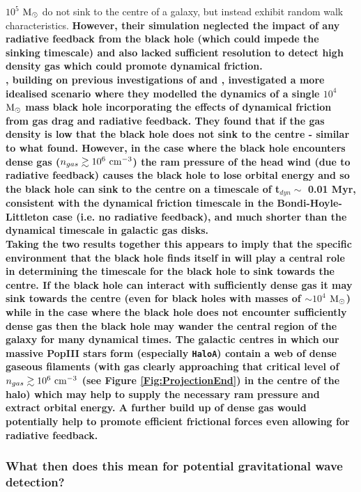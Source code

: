 \documentclass[twocolumn,iop,revtex4]{openjournal}
\newcommand{\msolar} {$\rm{M_{\odot}}~$}
\newcommand{\msolarc} {$\rm{M_{\odot}}$}
\newcommand{\hac} {\texttt{HaloA}}
\begin{document}
$10^5$ \msolar do not sink to the centre of a galaxy, but instead exhibit random walk characteristics.
\textbf{However, their simulation neglected the impact of any radiative feedback from the black hole 
(which could impede the sinking timescale) and
also lacked sufficient resolution to detect high density gas which could promote dynamical friction. \\
\indent \cite{Toyouchi_2020}, building on previous investigations of \cite{Park_2017} and \cite{Park_2019},
investigated a more idealised scenario where they modelled the
dynamics of a single $10^4$ \msolar mass black hole incorporating the effects of dynamical friction from gas drag
and radiative feedback. They found that if the gas density is low that the black hole
does not sink to the centre - similar to what \cite{Pfister_2019} found. However, in the case where
the black hole encounters dense gas ($n_{gas} \gtrsim 10^6 \ \rm{cm}^{-3}$) the ram pressure of
the head wind (due to radiative feedback)
causes the black hole to lose orbital energy and so the black hole can sink to the centre on a
timescale of t$_{dyn} \sim$ 0.01 Myr, consistent with the dynamical friction timescale
in the Bondi-Hoyle-Littleton case (i.e. no radiative feedback),
and much shorter than the dynamical timescale in galactic gas disks.\\
\indent Taking the two results together this
appears to imply that the specific environment that the black hole finds
itself in will play a central role in determining the timescale for the black hole
to sink towards the centre. If the black hole can interact with sufficiently dense gas it may
sink towards the centre (even for black holes with masses of $\sim 10^4$ \msolarc) while in
the case where the black hole does not encounter sufficiently dense gas then the black hole
may wander the central region of the galaxy for many dynamical times. The galactic centres
in which our massive PopIII
stars form (especially \hac) contain a web of dense gaseous filaments (with gas clearly approaching
that critical level of $n_{gas} \gtrsim 10^6  \ \rm{cm}^{-3}$ (see Figure \ref{Fig:ProjectionEnd}) in the centre of the halo)
which may help to supply
the necessary ram pressure and extract orbital energy. A further build up of dense gas would potentially
help to promote efficient frictional forces even allowing for radiative feedback.}

\subsubsection*{What then does this mean for potential gravitational wave detection?}
\end{document}

